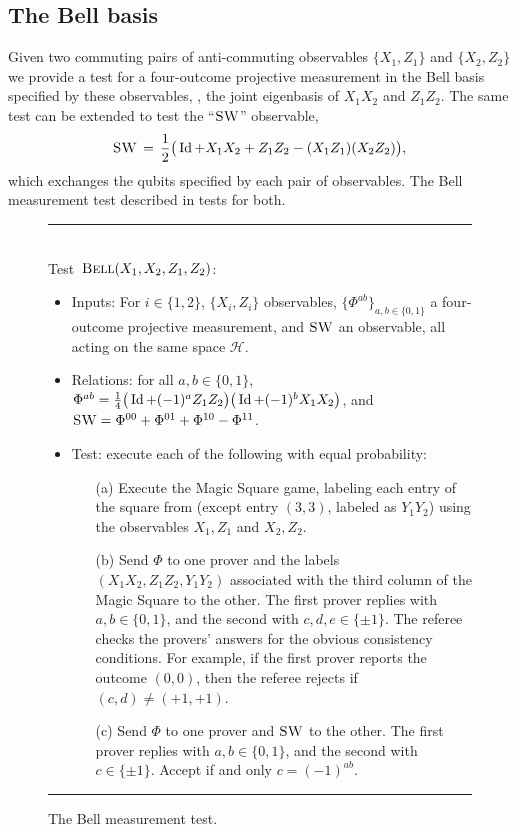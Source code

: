 \documentclass{toc}
\newcommand{\Id}{\ensuremath{\mathop{\rm Id}\nolimits}}
\newcommand{\mH}{\mathcal{H}}
\newcommand{\bellt}{\textsc{Bell}}
\newcommand{\SWAP}{\textsc{SW}}
\begin{document}
\subsection{The Bell basis}
\label{sec:bell}


Given two commuting pairs of anti-commuting observables $\{X_1,Z_1\}$ and $\{X_2,Z_2\}$ we provide a test for a four-outcome projective measurement in the Bell basis specified by these observables, \ie, the joint eigenbasis of $X_1X_2$ and $Z_1Z_2$. The same test can be extended to test the ``$\SWAP$'' observable,
\begin{equation}\label{eq:def-swap}
 \SWAP \,=\, \frac{1}{2} \big( \Id + X_1X_2 + Z_1Z_2 - (X_1Z_1)(X_2Z_2) \big),
\end{equation}
 which exchanges the  qubits specified by each pair of observables. The Bell measurement test described in  tests for both. 


\begin{figure}[H]
\rule[1ex]{\textwidth}{0.5pt}\\
\justifying
Test~$\bellt(X_1,X_2,Z_1,Z_2)$:
\begin{itemize}
    \item Inputs: For $i\in\{1,2\}$, $\{X_i,Z_i\}$ observables, $\{\Phi^{ab}\}_{a,b\in\{0,1\}}$ a four-outcome projective measurement, and $\SWAP$ an observable, all acting on the same space $\mH$.
    \item Relations: for all $a,b\in\{0,1\}$, $\Phi^{ab} = \frac{1}{4}\big(\Id+(-1)^a Z_1Z_2\big)\big(\Id+(-1)^bX_1X_2\big)$, and $\SWAP = \Phi^{00} + \Phi^{01} + \Phi^{10} - \Phi^{11}$.   
    \item Test: execute each of the following with equal probability:
		\begin{enumerate}
		\item[(a)] Execute the Magic Square game, labeling each entry of the square from  (except entry $(3,3)$, labeled as $Y_1Y_2$) using the observables $X_1,Z_1$ and $X_2,Z_2$.
		\item[(b)] Send $\Phi$ to one prover and the labels $(X_1X_2,Z_1Z_2,Y_1Y_2)$ associated with the third column of the Magic Square to the other.  The first prover replies with $a,b\in\{0,1\}$, and the second with $c,d,e\in \{\pm 1\}$. The referee checks the provers' answers for the obvious consistency conditions. For example, if the first prover reports the outcome $(0,0)$, then the referee rejects if $(c,d)\neq (+1,+1)$. 
		\item[(c)] Send $\Phi$ to one prover and $\SWAP$ to the other. The first prover replies with $a,b\in\{0,1\}$, and the second with $c\in \{\pm 1\}$. Accept if and only $c=(-1)^{ab}$. 
		\end{enumerate}
\end{itemize}
\rule[2ex]{\textwidth}{0.5pt}\vspace{-.5cm}
\caption{The Bell measurement test.}
\label{fig:bell}
\end{figure}
\end{document}
